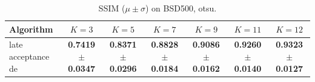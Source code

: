 \begin{table}[htbp]
\centering
\caption{SSIM ($\mu \pm \sigma$) on BSD500, otsu.}
\label{tab:exp1-otsu-ssim}
\begin{tabular}{lcccccc}
\toprule
Algorithm & $K=3$ & $K=5$ & $K=7$ & $K=9$ & $K=11$ & $K=12$ \\
\midrule
late acceptance de & \textbf{0.7419 $\pm$ 0.0347} & \textbf{0.8371 $\pm$ 0.0296} & \textbf{0.8828 $\pm$ 0.0184} & \textbf{0.9086 $\pm$ 0.0162} & \textbf{0.9260 $\pm$ 0.0140} & \textbf{0.9323 $\pm$ 0.0127} \\
\bottomrule
\end{tabular}
\end{table}